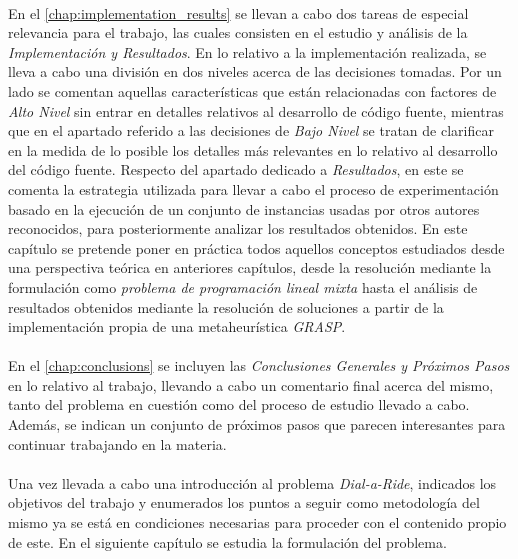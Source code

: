 \documentclass{subfiles}
\begin{document}
      \paragraph{}
      En el \cref{chap:implementation_results} se llevan a cabo dos tareas de especial relevancia para el trabajo, las cuales consisten en el estudio y análisis de la \emph{Implementación y Resultados}. En lo relativo a la implementación realizada, se lleva a cabo una división en dos niveles acerca de las decisiones tomadas. Por un lado se comentan aquellas características que están relacionadas con factores de \emph{Alto Nivel} sin entrar en detalles relativos al desarrollo de código fuente, mientras que en el apartado referido a las decisiones de \emph{Bajo Nivel} se tratan de clarificar en la medida de lo posible los detalles más relevantes en lo relativo al desarrollo del código fuente. Respecto del apartado dedicado a \emph{Resultados}, en este se comenta la estrategia utilizada para llevar a cabo el proceso de experimentación basado en la ejecución de un conjunto de instancias usadas por otros autores reconocidos, para posteriormente analizar los resultados obtenidos. En este capítulo se pretende poner en práctica todos aquellos conceptos estudiados desde una perspectiva teórica en anteriores capítulos, desde la resolución mediante la formulación como \emph{problema de programación lineal mixta} hasta el análisis de resultados obtenidos mediante la resolución de soluciones a partir de la implementación propia de una metaheurística \emph{GRASP}.

      \paragraph{}
      En el \cref{chap:conclusions} se incluyen las \emph{Conclusiones Generales y Próximos Pasos} en lo relativo al trabajo, llevando a cabo un comentario final acerca del mismo, tanto del problema en cuestión como del proceso de estudio llevado a cabo. Además, se indican un conjunto de próximos pasos que parecen interesantes para continuar trabajando en la materia.

    \paragraph{}
     Una vez llevada a cabo una introducción al problema \emph{Dial-a-Ride}, indicados los objetivos del trabajo y enumerados los puntos a seguir como metodología del mismo ya se está en condiciones necesarias para proceder con el contenido propio de este. En el siguiente capítulo se estudia la formulación del problema.
\end{document}
